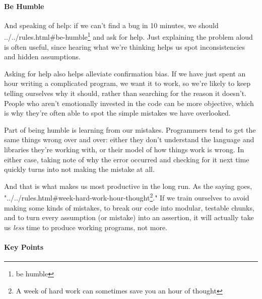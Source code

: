 \documentclass[]{book}
\newcommand{\urlfoot}[2]{{#1}\footnote{#2}}
\begin{document}
\mbox{}\paragraph{Be Humble}

And speaking of help: if we can't find a bug in 10 minutes, we should
\urlfoot{../../rules.html\#be-humble}{be humble} and ask for help. Just
explaining the problem aloud is often useful, since hearing what we're
thinking helps us spot inconsistencies and hidden assumptions.

Asking for help also helps alleviate confirmation bias. If we have just
spent an hour writing a complicated program, we want it to work, so
we're likely to keep telling ourselves why it should, rather than
searching for the reason it doesn't. People who aren't emotionally
invested in the code can be more objective, which is why they're often
able to spot the simple mistakes we have overlooked.

Part of being humble is learning from our mistakes. Programmers tend to
get the same things wrong over and over: either they don't understand
the language and libraries they're working with, or their model of how
things work is wrong. In either case, taking note of why the error
occurred and checking for it next time quickly turns into not making the
mistake at all.

And that is what makes us most productive in the long run. As the saying
goes, "\urlfoot{../../rules.html\#week-hard-work-hour-thought}{A week of
hard work can sometimes save you an hour of thought}." If we train
ourselves to avoid making some kinds of mistakes, to break our code into
modular, testable chunks, and to turn every assumption (or mistake) into
an assertion, it will actually take us \emph{less} time to produce
working programs, not more.

\mbox{}\paragraph{Key Points}
\end{document}

